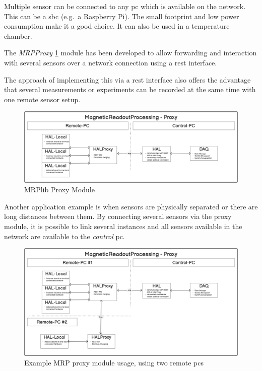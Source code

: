 Multiple sensor can be connected to any \gls{pc} which is available on
the network. This can be a \gls{sbc} (e.g.~a Raspberry Pi). The small
footprint and low power consumption make it a good choice. It can also
be used in a temperature chamber.

The \emph{MRPProxy} \ref{MRPlib_Proxy_Module.png} module has been
developed to allow forwarding and interaction with several sensors over
a network connection using a \gls{rest} interface.

The approach of implementing this via a \gls{rest} interface also offers
the advantage that several measurements or experiments can be recorded
at the same time with one remote sensor setup.

\begin{figure}
\centering
\includegraphics{./generated_images/border_MRPlib_Proxy_Module.png}
\caption{MRPlib Proxy Module \label{MRPlib_Proxy_Module.png}}
\end{figure}

Another application example is when sensors are physically separated or
there are long distances between them. By connecting several sensors via
the proxy module, it is possible to link several instances and all
sensors available in the network are available to the \emph{control}
\gls{pc}.

\begin{figure}
\centering
\includegraphics{./generated_images/border_Example_MRP_proxy_module_usage,_using_two_remote_(+pc)s.png}
\caption{Example MRP proxy module usage, using two remote \gls{pc}s
\label{Example_MRP_proxy_module_usage,_using_two_remote_(+pc)s.png}}
\end{figure}

